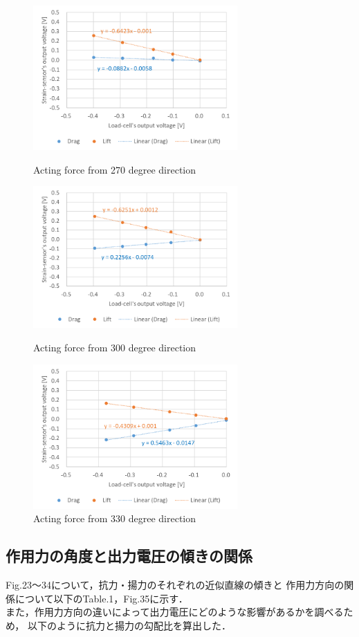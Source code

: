 \documentclass[twocolumn,a4j]{jsarticle}
\begin{document}
\begin{figure}[htbp]
    \footnotesize
    \begin{center}
        \includegraphics[width=78mm]{../images/270.png}
        \caption{Acting force from 270 degree direction}
        \includegraphics[width=78mm]{../images/300.png}
        \caption{Acting force from 300 degree direction}
        \includegraphics[width=78mm]{../images/330.png}
        \caption{Acting force from 330 degree direction}
    \end{center}
\end{figure}

\newpage
\;
\newpage
\;
\newpage

\subsection{作用力の角度と出力電圧の傾きの関係}

Fig.23～34について，抗力・揚力のそれぞれの近似直線の傾きと
作用力方向の関係について以下のTable.1，Fig.35に示す．\\
また，作用力方向の違いによって出力電圧にどのような影響があるかを調べるため，
以下のように抗力と揚力の勾配比を算出した．\\
\end{document}
